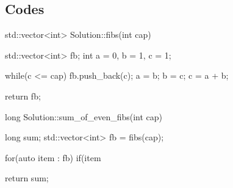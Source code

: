 \subsection{Codes}
\begin{cpp}
	std::vector<int> Solution::fibs(int cap)
	{
			std::vector<int> fb;
			int a = 0, b = 1, c = 1;

			while(c <= cap)
			{
					fb.push_back(c);
					a = b;
					b = c;
					c = a + b;
				}

			return fb;
		}

	long Solution::sum_of_even_fibs(int cap)
	{
			long sum{};
			std::vector<int> fb = fibs(cap);

			for(auto item : fb)
			{
					if(item %
				}

			return sum;
		}
\end{cpp}
